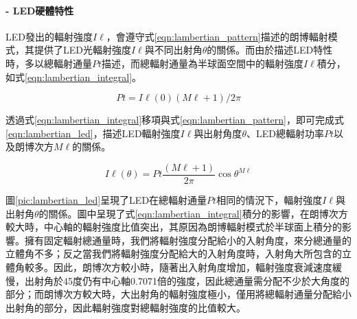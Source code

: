             \paragraph*{- LED硬體特性}

            \hfill

                LED發出的輻射強度$I\ell$，會遵守式\ref{eqn:lambertian_pattern}描述的朗博輻射模式，其提供了LED光輻射強度$I\ell$與不同出射角$\theta$的關係。而由於描述LED特性時，多以總輻射通量$Pt$描述，而總輻射通量為半球面空間中的輻射強度$I\ell$積分，如式\ref{eqn:lambertian_integral}。

                \begin{equation}
                    \label{eqn:lambertian_integral}
                    Pt = I\ell(0)(M\ell+1)/2\pi
                \end{equation}
                
                透過式\ref{eqn:lambertian_integral}移項與式\ref{eqn:lambertian_pattern}，即可完成式\ref{eqn:lambertian_led}，描述LED輻射強度$I\ell$與出射角度$\theta$、LED總輻射功率$Pt$以及朗博次方$M\ell$的關係。
            
                \begin{equation}
                    \label{eqn:lambertian_led}
                    I\ell(\theta)=Pt\frac{(M\ell+1)}{2 \pi} \cos \theta^{M\ell}
                \end{equation}

                圖\ref{pic:lambertian_led}呈現了LED在總輻射通量$Pt$相同的情況下，輻射強度$I\ell$與出射角$\theta$的關係。圖中呈現了式\ref{eqn:lambertian_integral}積分的影響，在朗博次方較大時，中心軸的輻射強度比值突出，其原因為朗博輻射模式於半球面上積分的影響。擁有固定輻射總通量時，我們將輻射強度分配給小的入射角度，來分總通量的立體角不多；反之當我們將輻射強度分配給大的入射角度時，入射角大所包含的立體角較多。因此，朗博次方較小時，隨著出入射角度增加，輻射強度衰減速度緩慢，出射角於45度仍有中心軸0.7071倍的強度，因此總通量需分配不少於大角度的部分；而朗博次方較大時，大出射角的輻射強度極小，僅用將總輻射通量分配給小出射角的部分，因此輻射強度對總輻射強度的比值較大。

